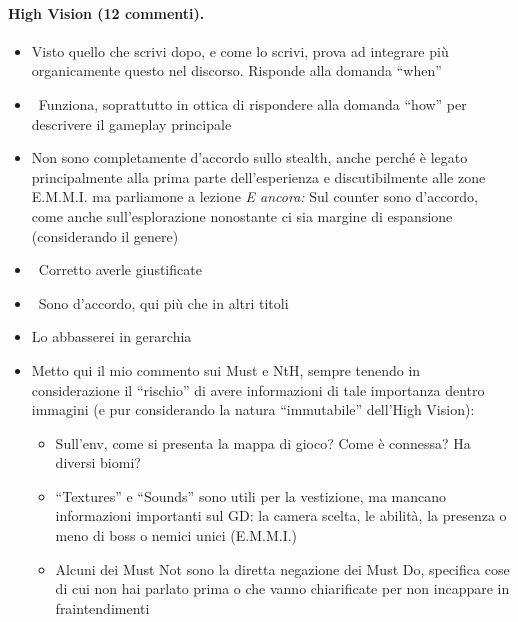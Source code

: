 \paragraph{High Vision (12 commenti).}
{\small
\begin{itemize}
  \item {} Visto quello che scrivi dopo, e come lo scrivi, prova ad integrare più organicamente questo nel discorso. Risponde alla domanda ``when''
  \item {} \rvBene\ Funziona, soprattutto in ottica di rispondere alla domanda ``how'' per descrivere il gameplay principale
  \item {} Non sono completamente d'accordo sullo stealth, anche perché è legato principalmente alla prima parte dell'esperienza e discutibilmente alle zone E.M.M.I. ma parliamone a lezione \emph{E ancora:} Sul counter sono d'accordo, come anche sull'esplorazione nonostante ci sia margine di espansione (considerando il genere)
  \item {} \rvBene\ Corretto averle giustificate
  \item {} \rvBene\ Sono d'accordo, qui più che in altri titoli
  \item {} Lo abbasserei in gerarchia
  \item {} Metto qui il mio commento sui Must e NtH, sempre tenendo in considerazione il ``rischio'' di avere informazioni di tale importanza dentro immagini (e pur considerando la natura ``immutabile'' dell'High Vision):
        \begin{itemize}
          \item Sull'env, come si presenta la mappa di gioco? Come è connessa? Ha diversi biomi?
          \item ``Textures'' e ``Sounds'' sono utili per la vestizione, ma mancano informazioni importanti sul GD: la camera scelta, le abilità, la presenza o meno di boss o nemici unici (E.M.M.I.)
          \item Alcuni dei Must Not sono la diretta negazione dei Must Do, specifica cose di cui non hai parlato prima o che vanno chiarificate per non incappare in fraintendimenti

\end{itemize}
\end{itemize}}
